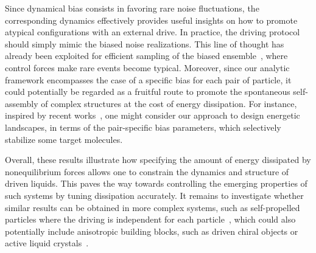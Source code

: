 \documentclass[superscriptaddress, twocolumn, prx, longbibliography, nofootinbib]{revtex4-1}
\begin{document}
Since dynamical bias consists in favoring rare noise fluctuations, the corresponding dynamics effectively provides useful insights on how to promote atypical configurations with an external drive. In practice, the driving protocol should simply mimic the biased noise realizations. This line of thought has already been exploited for efficient sampling of the biased ensemble~\cite{Nemoto2016, Jack2017, Jack2018}, where control forces make rare events become typical. Moreover, since our analytic framework encompasses the case of a specific bias for each pair of particle, it could potentially be regarded as a fruitful route to promote the spontaneous self-assembly of complex structures at the cost of energy dissipation. For instance, inspired by recent works~\cite{Murugan2015, Murugan2017b}, one might consider our approach to design energetic landscapes, in terms of the pair-specific bias parameters, which selectively stabilize some target molecules. 


Overall, these results illustrate how specifying the amount of energy dissipated by nonequilibrium forces allows one to constrain the dynamics and structure of driven liquids. This paves the way towards controlling the emerging properties of such systems by tuning dissipation accurately. It remains to investigate whether similar results can be obtained in more complex systems, such as self-propelled particles where the driving is independent for each particle~\cite{Marchetti2013, Cates2015, Bechinger2016, Marchetti2018}, which could also potentially include anisotropic building blocks, such as driven chiral objects or active liquid crystals~\cite{Joshi2017, VanZuiden2016, Nguyen2014b}. 




\end{document}
